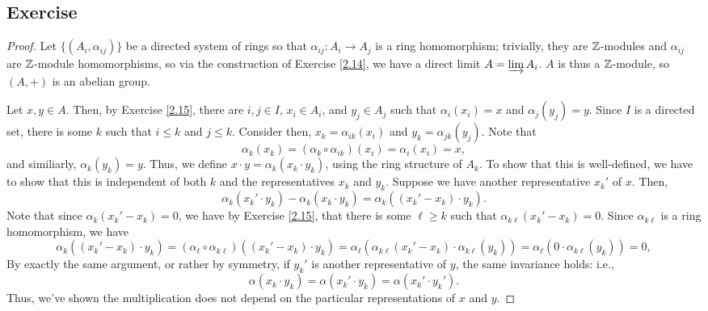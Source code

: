 \subsection{Exercise}\label{2.21} %

\begin{proof}
Let $\{(A_i,\alpha_{ij})\}$ be a directed system of rings so that $\alpha_{ij} : A_i \to A_j$ is a ring homomorphism; trivially, they are $\mathbb{Z}$-modules and $\alpha_{ij}$
are $\mathbb{Z}$-module homomorphisms, so via the construction of Exercise \ref{2.14}, we have a direct limit $A = \varinjlim A_i$. $A$ is thus a $\mathbb{Z}$-module, so $(A,+)$ is an
abelian group.

Let $x,y \in A$. Then, by Exercise \ref{2.15}, there are $i,j \in I$, $x_i \in A_i$, and $y_j \in A_j$ such that $\alpha_i(x_i) = x$ and $\alpha_j(y_j) = y$. Since
$I$ is a directed set, there is some $k$ such that $i \le k$ and $j \le k$. Consider then, $x_k = \alpha_{ik}(x_i)$ and $y_k = \alpha_{jk}(y_j)$. Note that
$$\alpha_k(x_k) = (\alpha_k \circ \alpha_{ik})(x_i) = \alpha_i(x_i) = x,$$
and similiarly, $\alpha_k(y_k) = y$. Thus, we define $x \cdot y = \alpha_k(x_k \cdot y_k)$, using the ring structure of $A_k$. To show that this is well-defined, we have
to show that this is independent of both $k$ and the representatives $x_k$ and $y_k$. Suppose we have another representative $x_k'$ of $x$. Then, 
$$\alpha_k(x_k' \cdot y_k) - \alpha_k(x_k \cdot y_k) = \alpha_k((x_k' - x_k) \cdot y_k).$$
Note that since $\alpha_k(x_k' - x_k) = 0$, we have by Exercise \ref{2.15}, that there is some $\ell \ge k$ such that $\alpha_{k\ell}(x_k' - x_k) = 0$. Since
$\alpha_{k\ell}$ is a ring homomorphism, we have
$$\alpha_k((x_k' - x_k) \cdot y_k) = (\alpha_{\ell}\circ\alpha_{k\ell})((x_k' - x_k) \cdot y_k) = \alpha_{\ell}(\alpha_{k\ell}(x_k' - x_k)\cdot\alpha_{k\ell}(y_k)) = \alpha_{\ell}(0\cdot\alpha_{k\ell}(y_k)) = 0,$$
By exactly the same argument, or rather by symmetry, if $y_k'$ is another representative of $y$, the same invariance holds: i.e.,
$$\alpha(x_k \cdot y_k) = \alpha(x_k' \cdot y_k) = \alpha(x_k' \cdot y_k').$$
Thus, we've shown the multiplication does not depend on the particular representations of $x$ and $y$. 


\end{proof}
